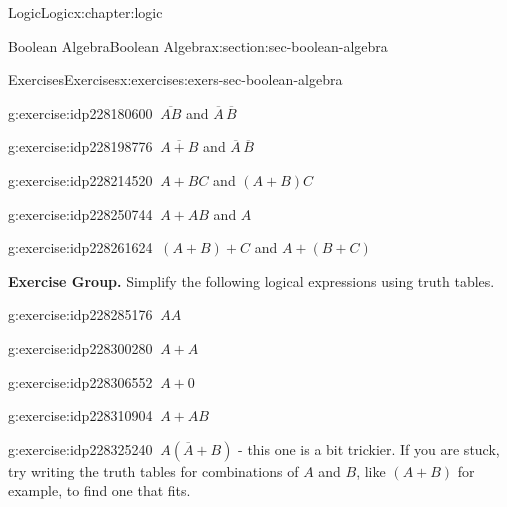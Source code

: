 \documentclass[twoside,10pt,]{book}
\numberwithin{equation}{section}
\begin{document}
\begin{chapterptx}{Logic}{}{Logic}{}{}{x:chapter:logic}
\begin{sectionptx}{Boolean Algebra}{}{Boolean Algebra}{}{}{x:section:sec-boolean-algebra}
\begin{exercises-subsection}{Exercises}{}{Exercises}{}{}{x:exercises:exers-sec-boolean-algebra}
\begin{exercisegroup}
\begin{divisionexerciseeg}{25}{}{}{g:exercise:idp228180600}%
\(\ \overline{AB}\) and \(\overline{A}\,\overline{B}\)\end{divisionexerciseeg}%
\begin{divisionexerciseeg}{26}{}{}{g:exercise:idp228198776}%
\(\ \overline{A+B}\) and \(\overline{A}\,\overline{B}\)\end{divisionexerciseeg}%
\begin{divisionexerciseeg}{27}{}{}{g:exercise:idp228214520}%
\(\ A+BC\) and \((A+B)C\)\end{divisionexerciseeg}%
\begin{divisionexerciseeg}{28}{}{}{g:exercise:idp228250744}%
\(\ A+AB\) and \(A\)\end{divisionexerciseeg}%
\begin{divisionexerciseeg}{29}{}{}{g:exercise:idp228261624}%
\(\ (A+B)+C\) and \(A+(B+C)\)\end{divisionexerciseeg}%
\end{exercisegroup}
\par\medskip\noindent
\par\medskip\noindent%
\textbf{Exercise Group.}\space\space%
Simplify the following logical expressions using truth tables.\begin{exercisegroup}
\begin{divisionexerciseeg}{30}{}{}{g:exercise:idp228285176}%
\(\ AA\)\end{divisionexerciseeg}%
\begin{divisionexerciseeg}{31}{}{}{g:exercise:idp228300280}%
\(\ A+A\)\end{divisionexerciseeg}%
\begin{divisionexerciseeg}{32}{}{}{g:exercise:idp228306552}%
\(\ A+0\)\end{divisionexerciseeg}%
\begin{divisionexerciseeg}{33}{}{}{g:exercise:idp228310904}%
\(\ A+AB\)\end{divisionexerciseeg}%
\begin{divisionexerciseeg}{34}{}{}{g:exercise:idp228325240}%
\(\ A(\overline{A}+B)\) - this one is a bit trickier.  If you are stuck, try writing the truth tables for combinations of \(A\) and \(B\), like \((A+B)\) for example, to find one that fits.\end{divisionexerciseeg}%
\end{exercisegroup}
\par\medskip\noindent
\end{exercises-subsection}

\end{sectionptx}
\end{chapterptx}
\end{document}
